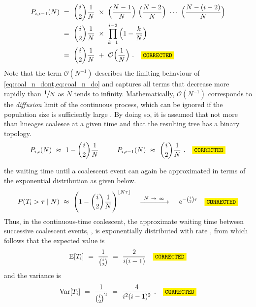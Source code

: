 \begin{equation}\label{eq:coal_n_do}
\begin{split}
	P_{i,i-1}(N)
	& ~=~ {i \choose 2} \frac{1}{N} ~\times~ \Big(\frac{N-1}{N}\Big) ~ \Big(\frac{N-2}{N}\Big) ~ \cdots ~ \Big(\frac{N-(i-2)}{N}\Big) \\
	& ~=~ {i \choose 2} \frac{1}{N} ~\times~ \prod_{k=1}^{i-2} \Big( 1 - \frac{k}{N} \Big) \\
	& ~=~ {i \choose 2} \frac{1}{N} ~+~ \mathcal{O}\Big( \frac{1}{N} \Big)
	\ \text{.} \CorrectLabel
\end{split}
\end{equation}
Note that the term ${\mathcal{O}(N^{-1})}$ describes the limiting behaviour of \cref{eq:coal_n_dont,eq:coal_n_do} and captures all terms that decrease more rapidly than $\large \sfrac{1}{N}$ as $N$ tends to infinity.
Mathematically, ${\mathcal{O}(N^{-1})}$ corresponds to the \emph{diffusion} limit of the continuous process, which can be ignored if the population size is sufficiently large \citep[\eg, see][]{wakeley2008}.
By doing so, it is assumed that not more than  lineages coalesce at a given time and that the resulting tree has a binary topology.
\begin{equation*}
	P_{i,i}(N) ~\approx~ 1 - {i \choose 2} \frac{1}{N} ~ \qquad ~
  P_{i,i-1}(N) ~\approx~ {i \choose 2} \frac{1}{N}
  \ \text{.} \CorrectLabel
\end{equation*}

 the waiting time until a coalescent event can again be approximated in terms of the exponential distribution as given below.
\begin{equation}\label{eq:coal_n_approx}
	P(T_i > \tau \mid N)
	~\approx~ \Bigg( 1 - {i \choose 2} \frac{1}{N} \Bigg)^{\lfloor N \tau \rfloor}
	\quad \xrightarrow{~ N~\rightarrow~\infty ~} \quad
	\euler{-{i \choose 2}\tau} \CorrectLabel
\end{equation}
Thus, in the continuous-time coalescent, the approximate waiting time between successive coalescent events, , is exponentially distributed with rate , from which follows that the expected value is
\begin{equation}\label{eq:coal_n_exp}
	\mathbb{E}[T_i] ~=~ \frac{1}{{i \choose 2}} ~=~ \frac{2}{i(i-1)} \CorrectLabel
\end{equation}
and the variance is
\begin{equation}\label{eq:coal_n_var}
	\operatorname{Var}[T_i] ~=~ \frac{1}{{i \choose 2}^2} ~=~ \frac{4}{i^2 (i-1)^2}
	\ . \CorrectLabel
\end{equation}

